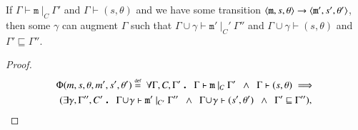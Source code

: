 \begin{theorem}\label{pres-mPreservation}
  If $\Gamma\vdash \mathtt{m}\ |_C\ \Gamma'$ and $\Gamma\vdash(s, \theta)$ and we have some
  transition $\langle{}\mathtt{m},s,\theta\rangle{}\rightarrow{}\langle{}\mathtt{m'},s',\theta'\rangle$, then some $\gamma$ can augment $\Gamma$ such that
  $\Gamma\!\cup\!\gamma\vdash\mathtt{m'}\ |_C'\ \Gamma''$ and $\Gamma\!\cup\!\gamma\vdash(s,\theta)$ and 
  $\Gamma'\sqsubseteq\Gamma''$.
\end{theorem}
\begin{proof}
  \begin{multline*}
 	\Phi(m, s, \theta, m', s', \theta') \eqdef 
	\	\forall\Gamma,C,\Gamma' \qdot
	\Gamma\vdash\mathtt{m}\ |_C\ \Gamma' 
	\enspace\land\enspace\Gamma\vdash (s,\theta)
	\implies \\
   	(\exists\gamma,\Gamma'',C'\qdot
    \Gamma\!\cup\!\gamma\vdash \mathtt{m'}\ |_{C'}\ \Gamma'' 
	\enspace\land\enspace\Gamma\!\cup\!\gamma\vdash (s',\theta')
	\enspace\land\enspace \Gamma'\sqsubseteq\Gamma''),
  \end{multline*} 



\end{proof}
